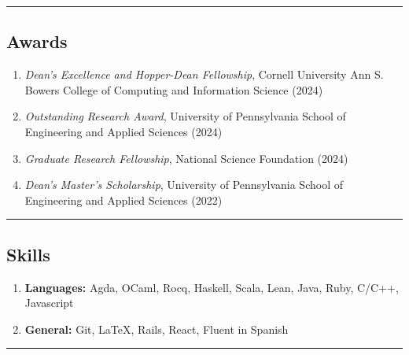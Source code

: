 \documentclass[letterpaper]{article}
\begin{document}
\hrule

\subsection*{Awards}
\begin{enumerate}[label=]
	\parskip=-0.25em
    \item \emph{Dean's Excellence and Hopper-Dean Fellowship}, Cornell University Ann S. Bowers College of Computing and Information Science (2024)
    \item \emph{Outstanding Research Award}, University of Pennsylvania School of Engineering and Applied Sciences (2024)
    \item \emph{Graduate Research Fellowship}, National Science Foundation (2024)
    \item \emph{Dean's Master's Scholarship}, University of Pennsylvania School of Engineering and Applied Sciences (2022)
\end{enumerate}
\hrule

\subsection*{Skills}
\begin{enumerate}[label=]
	\parskip=-0.25em

	\item
	\textbf{Languages: } Agda, OCaml, Rocq, Haskell, Scala, Lean, Java, Ruby, C/C++, Javascript

	\item
	\textbf{General: } Git, \LaTeX, Rails, React, Fluent in Spanish

\end{enumerate}
\hrule
\end{document}
